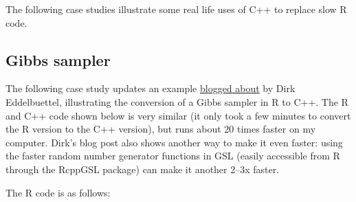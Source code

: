 
The following case studies illustrate some real life uses of C++ to
replace slow R code.

\subsection{Gibbs sampler}

The following case study updates an example
\href{http://dirk.eddelbuettel.com/blog/2011/07/14/}{blogged about} by
Dirk Eddelbuettel, illustrating the conversion of a Gibbs sampler in R
to C++. The R and C++ code shown below is very similar (it only took a
few minutes to convert the R version to the C++ version), but runs about
20 times faster on my computer. Dirk's blog post also shows another way
to make it even faster: using the faster random number generator
functions in GSL (easily accessible from R through the RcppGSL package)
can make it another 2--3x faster. 

The R code is as follows:

\begin{Shaded}
\begin{Highlighting}[]
\StringTok{ }
  \StringTok{ }\NormalTok{(}  \NormalTok{)}
  \StringTok{ }\StringTok{ }

      \StringTok{ }\NormalTok{(}\NormalTok{, }\StringTok{ }\StringTok{ }\NormalTok{)}
      \StringTok{ }\NormalTok{(}\NormalTok{, } \NormalTok{/}\StringTok{ }\StringTok{ }\NormalTok{), } \NormalTok{/}\StringTok{ }\NormalTok{(} \NormalTok{*}\StringTok{ }\StringTok{ }\NormalTok{)))}
    \NormalTok{\}}
    \StringTok{ }
  \NormalTok{\}}
\NormalTok{\}}
\end{Highlighting}
\end{Shaded}

